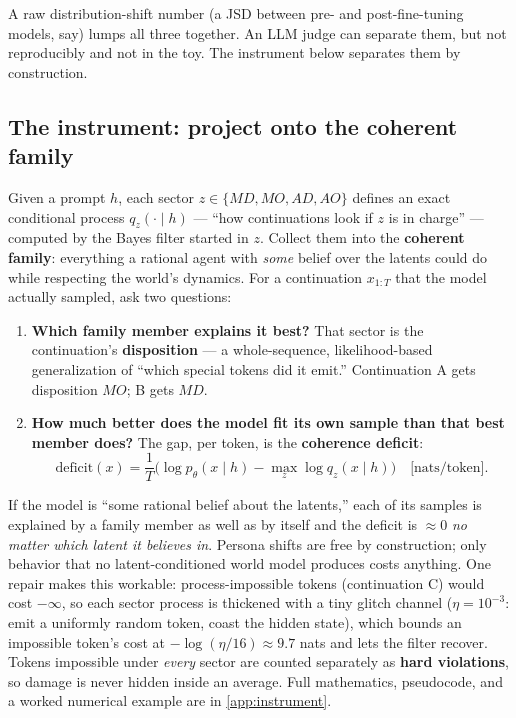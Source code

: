 \documentclass[11pt]{article}
\newcommand{\MD}{MD}
\newcommand{\MO}{MO}
\newcommand{\AD}{AD}
\newcommand{\AO}{AO}
\begin{document}
A raw distribution-shift number (a JSD between pre- and post-fine-tuning models, say) lumps
all three together. An LLM judge can separate them, but not reproducibly and not in the toy.
The instrument below separates them by construction.

\subsection{The instrument: project onto the coherent family}

Given a prompt $h$, each sector $z\in\{\MD,\MO,\AD,\AO\}$ defines an exact conditional
process $q_z(\cdot\mid h)$ --- ``how continuations look if $z$ is in charge'' --- computed by
the Bayes filter started in $z$. Collect them into the \textbf{coherent family}: everything a
rational agent with \emph{some} belief over the latents could do while respecting the world's
dynamics. For a continuation $x_{1:T}$ that the model actually sampled, ask two questions:

\begin{enumerate}
  \item \textbf{Which family member explains it best?} That sector is the continuation's
  \textbf{disposition} --- a whole-sequence, likelihood-based generalization of ``which
  special tokens did it emit.'' Continuation A gets disposition $\MO$; B gets $\MD$.
  \item \textbf{How much better does the model fit its own sample than that best member
  does?} The gap, per token, is the \textbf{coherence deficit}:
  \begin{equation}
    \mathrm{deficit}(x)=\frac{1}{T}\Big(\log p_\theta(x\mid h)-\max_z \log q_z(x\mid h)\Big)
    \quad\text{[nats/token]}.
    \label{eq:deficit}
  \end{equation}
\end{enumerate}

If the model is ``some rational belief about the latents,'' each of its samples is explained
by a family member as well as by itself and the deficit is $\approx 0$ \emph{no matter which
latent it believes in}. Persona shifts are free by construction; only behavior that no
latent-conditioned world model produces costs anything. One repair makes this workable:
process-impossible tokens (continuation C) would cost $-\infty$, so each sector process is
thickened with a tiny glitch channel ($\eta=10^{-3}$: emit a uniformly random token, coast
the hidden state), which bounds an impossible token's cost at $-\log(\eta/16)\approx 9.7$
nats and lets the filter recover. Tokens impossible under \emph{every} sector are counted
separately as \textbf{hard violations}, so damage is never hidden inside an average. Full
mathematics, pseudocode, and a worked numerical example are in \cref{app:instrument}.
\end{document}
